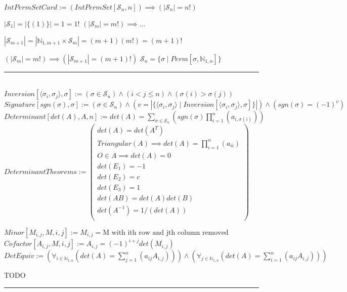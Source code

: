 \documentclass{book}
\newcommand{\abr}{:=}
\newcommand{\st}{\mathbin{|}}
\begin{document}
$IntPermSetCard \abr (IntPermSet[\mathcal{S}_n, n]) \implies (|\mathcal{S}_n| = n!)$
\begin{enumerate}
  \lit $|\mathcal{S}_1| = |\{(1)\}| = 1 = 1!$
  \lit $(|\mathcal{S}_m| = m!) \implies \ldots$
  \begin{enumerate}
    \lit $|\mathcal{S}_{m + 1}| = |\mathbb{N}_{1, m + 1} \times \mathcal{S}_m| = (m + 1) (m!) = (m + 1)!$
  \end{enumerate}
  \lit $(|\mathcal{S}_m| = m!) \implies (|\mathcal{S}_{m + 1}| = (m + 1)!)$
  \lit $\mathcal{S}_n = \{\sigma \st Perm[\sigma, \mathbb{N}_{1, n}]\}$
\end{enumerate} \vspace{.75mm} \hrule \vspace{.75mm} \ \\ 

$Inversion[\langle \sigma_i, \sigma_j \rangle, \sigma] \abr (\sigma \in \mathcal{S}_n) \land (i < j \leq n) \land (\sigma(i) > \sigma(j))$ \\
$Signature[sgn(\sigma), \sigma] \abr (\sigma \in \mathcal{S}_n) \land (v = |\{\langle \sigma_i, \sigma_j \rangle \st Inversion[\langle \sigma_i, \sigma_j \rangle, \sigma]\}|) \land (sgn(\sigma) = (-1)^v)$ \\
$Determinant[det(A), A, n] \abr det(A) = \sum_{\sigma \in \mathcal{S}_n}^{}(sgn(\sigma) \prod_{i = 1}^{n}(a_{i, \sigma(i)}))$ \\

$DeterminantTheorems \abr \left(\begin{array}{ll}
det(A) = det(A^T) \\
Triangular(A) \implies det(A) = \prod_{i = 1}^{n}(a_{ii}) \\
O \in A \implies det(A) = 0 \\
det(E_1) = -1 \\
det(E_2) = c \\
det(E_3) = 1 \\
det(A B) = det(A) det(B) \\
det(A^{-1}) = 1/(det(A)) \\
\end{array}\right)$

$Minor[M_{i, j}, M, i, j] \abr M_{i, j} = \text{M with ith row and jth column removed}$ \\
$Cofactor[A_{i, j}, M, i, j] \abr A_{i, j} = (-1)^{i + j} det(M_{i, j})$ \\

$DetEquiv \abr (\forall_{i \in \mathbb{N}_{1, n}}(det(A) = \sum_{j = 1}^{n}(a_{i j} A_{i, j}))) \land (\forall_{j \in \mathbb{N}_{1, n}}(det(A) = \sum_{i = 1}^{n}(a_{i j} A_{i, j})))$
\begin{enumerate}
  \lit TODO
\end{enumerate} \vspace{.75mm} \hrule \vspace{.75mm} \ \\ 
\end{document}
